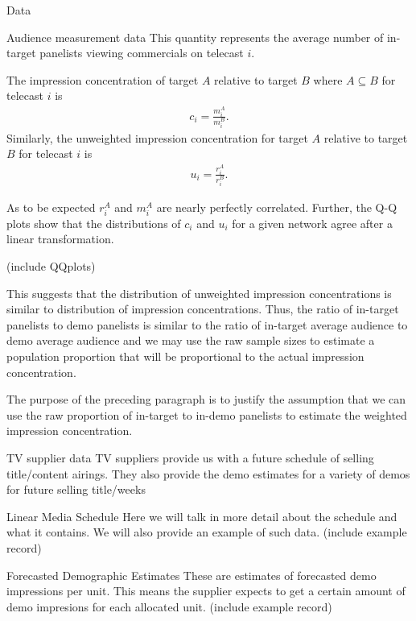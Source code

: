\begin{chapter}{Data}
\begin{section}{Audience measurement data}
  This quantity represents the average number of in-target panelists viewing commercials on telecast $i$.

  The impression concentration of target $A$ relative to target $B$ where $A \subseteq B$ for telecast $i$ is
  \begin{align*}
    c_i = \frac{m_{i}^A}{m_{i}^B}.
  \end{align*}
  Similarly, the unweighted impression concentration for target $A$ relative
  to target $B$ for telecast $i$ is
  \begin{align*}
    u_i = \frac{r_{i}^A}{r_{i}^B}.
  \end{align*}

  As to be expected $r_i^A$ and $m_i^A$ are nearly perfectly correlated. Further,
  the Q-Q plots show that the distributions of $c_i$ and $u_i$ for a given network agree
  after a linear transformation.

  (include QQplots)

  This suggests that the  distribution of unweighted impression concentrations is
  similar to distribution of impression concentrations. Thus, the ratio of in-target
  panelists to demo panelists is similar to the ratio of in-target average audience
  to demo average audience and we may use the raw sample sizes to estimate a population proportion
  that will be proportional to the actual impression concentration.

  The purpose of the preceding paragraph is to justify the assumption that we can use
  the raw proportion of in-target to in-demo panelists to estimate the weighted impression concentration.

\end{section}

\begin{section}{TV supplier data}
  TV suppliers provide us with a future schedule of selling title/content airings.
  They also provide the demo estimates for a variety of demos for future selling title/weeks

  \begin{subsection}{Linear Media Schedule}
    Here we will talk in more detail about the schedule and what it contains.
    We will also provide an example of such data.
    (include example record)
  \end{subsection}

  \begin{subsection}{Forecasted Demographic Estimates}
    These are estimates of forecasted demo impressions per unit. This means
    the supplier expects to get a certain amount of demo impresions for
    each allocated unit.
    (include example record)
  \end{subsection}
\end{section}

\end{chapter}